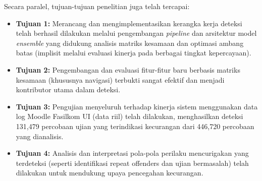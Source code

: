 Secara paralel, tujuan-tujuan penelitian juga telah tercapai:
\begin{itemize}
\item \textbf{Tujuan 1:} Merancang dan mengimplementasikan kerangka kerja deteksi telah berhasil dilakukan melalui pengembangan \textit{pipeline} dan arsitektur model \textit{ensemble} yang didukung analisis matriks kesamaan dan optimasi ambang batas (implisit melalui evaluasi kinerja pada berbagai tingkat kepercayaan).
\item \textbf{Tujuan 2:} Pengembangan dan evaluasi fitur-fitur baru berbasis matriks kesamaan (khususnya navigasi) terbukti sangat efektif dan menjadi kontributor utama dalam deteksi.
\item \textbf{Tujuan 3:} Pengujian menyeluruh terhadap kinerja sistem menggunakan data log Moodle Fasilkom UI (data riil) telah dilakukan, menghasilkan deteksi 131,479 percobaan ujian yang terindikasi kecurangan dari 446,720 percobaan yang dianalisis.
\item \textbf{Tujuan 4:} Analisis dan interpretasi pola-pola perilaku mencurigakan yang terdeteksi (seperti identifikasi repeat offenders dan ujian bermasalah) telah dilakukan untuk mendukung upaya pencegahan kecurangan.
\end{itemize}

